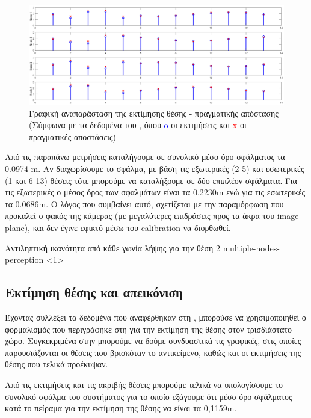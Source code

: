 \begin{figure}[H]
  \centering
  \includegraphics[width=0.9\linewidth]{../Images/Experiments-Results/nodes-estimations.png}
  \decoRule
  \caption[Γραφική αναπαράσταση της εκτίμησης θέσης - πραγματικής απόστασης]{Γραφική αναπαράσταση της εκτίμησης θέσης - πραγματικής απόστασης (Σύμφωνα με τα δεδομένα του , όπου \textcolor{blue}{o} οι εκτιμήσεις και \textcolor{red}{x} οι πραγματικές αποστάσεις)}
  \label{fig:est-act-dist-figure}
\end{figure}

Από τις παραπάνω μετρήσεις καταλήγουμε σε συνολικό μέσο όρο σφάλματος τα 0.0974 m. Αν διαχωρίσουμε το σφάλμα, με βάση τις εξωτερικές (2-5) και εσωτερικές (1 και 6-13) θέσεις τότε μπορούμε να καταλήξουμε σε δύο επιπλέον σφάλματα. Για τις εξωτερικές ο μέσος όρος των σφαλμάτων είναι τα 0.2230m ενώ για τις εσωτερικές τα 0.0686m. Ο λόγος που συμβαίνει αυτό, σχετίζεται με την παραμόρφωση που προκαλεί ο φακός της κάμερας (με μεγαλύτερες επιδράσεις προς τα άκρα του image plane), και δεν έγινε εφικτό μέσω του calibration να διορθωθεί.

{Αντιληπτική ικανότητα από κάθε γωνία λήψης για την θέση 2}%
{multiple-nodes-perception}%
<1>

\subsection{Εκτίμηση θέσης και απεικόνιση}
Έχοντας συλλέξει τα δεδομένα που αναφέρθηκαν στη , μπορούσε να χρησιμοποιηθεί ο φορμαλισμός που περιγράφηκε στη  για την εκτίμηση της θέσης στον τρισδιάστατο χώρο. Συγκεκριμένα στην  μπορούμε να δούμε συνδυαστικά τις γραφικές, στις οποίες παρουσιάζονται οι θέσεις που βρισκόταν το αντικείμενο, καθώς και οι εκτιμήσεις της θέσης που τελικά προέκυψαν.

Από τις εκτιμήσεις και τις ακριβής θέσεις μπορούμε τελικά να υπολογίσουμε το συνολικό σφάλμα του συστήματος για το οποίο εξάγουμε ότι μέσο όρο σφάλματος κατά το πείραμα για την εκτίμηση της θέσης να είναι τα 0,1159m.

